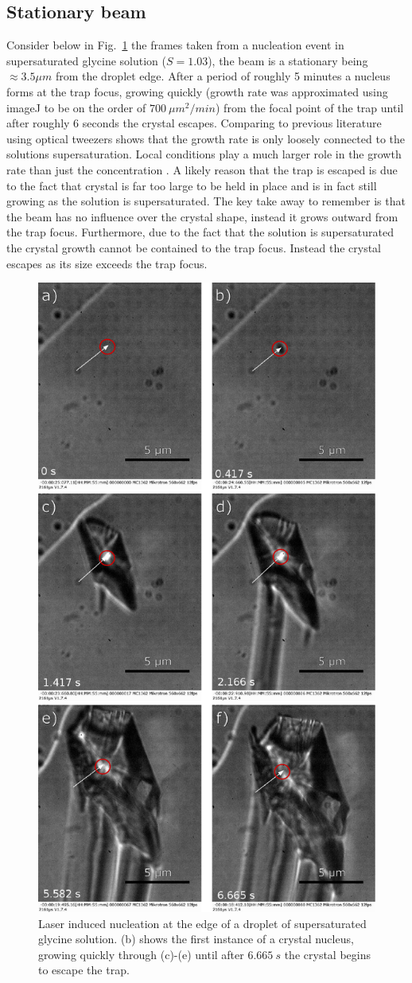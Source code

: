 \subsection{Stationary beam}
\label{sec:stationary}
Consider below in Fig.~\ref{fig:stationary_beam} the frames taken from a nucleation 
event in supersaturated glycine solution ($S=1.03$), the beam is a stationary being 
$\approx3.5 \mu m$ from the droplet edge. After a period of roughly 5 minutes a 
nucleus forms at the trap focus, growing quickly (growth rate was approximated using
imageJ to be on the order of $700\ \mu m^2/min$) from the focal point of the trap 
until after roughly $6$ seconds the crystal escapes. Comparing to previous literature
using optical tweezers shows that the growth rate is only loosely connected to the 
solutions supersaturation. Local conditions play a much larger role in the growth 
rate than just the concentration \cite{Flannigan2023}. A likely reason that the trap 
is escaped is due to the fact that crystal is far too large to be held in place and 
is in fact still growing as the solution is supersaturated. The key take away to 
remember is that the beam has no influence over the crystal shape, instead it 
grows outward from the trap focus. Furthermore, due to the fact that the solution
is supersaturated the crystal growth cannot be contained to the trap focus. Instead 
the crystal escapes as its size exceeds the trap focus. 
\begin{figure}[h!]
	\centering
	\includegraphics[width=0.75\linewidth, height=1.1\linewidth]{frames_no_beam_movement.pdf}
	\caption{Laser induced nucleation at the edge of a droplet of supersaturated 
	glycine solution. (b) shows the first instance of a crystal nucleus, growing 
	quickly through (c)-(e) until after $6.665\ s$ the crystal begins to escape 
	the trap.}
	\label{fig:stationary_beam}
\end{figure}

